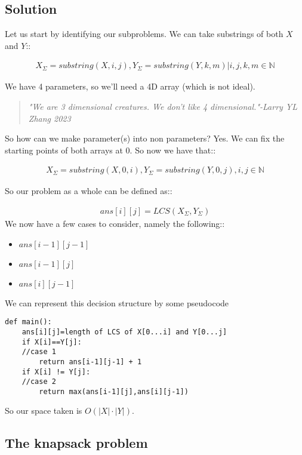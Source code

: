 \documentclass[12pt]{book}
\begin{document}
\subsection*{Solution}
Let us start by identifying our subproblems. We can take substrings of both $X$ and $Y$::

\begin{align*}
    X_{\Sigma}=substring(X,i,j), Y_{\Sigma}=substring(Y,k,m)|i,j,k,m\in \mathbb{N}
\end{align*}

We have 4 parameters, so we'll need a 4D array (which is not ideal).

\begin{quote}
    \textit{"We are 3 dimensional creatures. We don't like 4 dimensional."-Larry YL Zhang 2023}
\end{quote}

So how can we make parameter(s) into non parameters? Yes. We can fix the starting points of both arrays at 0. So now we have that::

\begin{align*}
    X_{\Sigma}=substring(X,0,i), Y_{\Sigma}=substring(Y,0,j), i,j\in \mathbb{N}
\end{align*}

So our problem as a whole can be defined as::

\begin{align*}
    ans[i][j]=LCS(X_{\Sigma}, Y_{\Sigma})
\end{align*}
\newpage
We now have a few cases to consider, namely the following::

\begin{itemize}
    \item $ans[i-1][j-1]$
    \item $ans[i-1][j]$
    \item $ans[i][j-1]$
\end{itemize}

We can represent this decision structure by some pseudocode

\begin{lstlisting}
def main():
    ans[i][j]=length of LCS of X[0...i] and Y[0...j]
    if X[i]==Y[j]:
    //case 1
        return ans[i-1][j-1] + 1
    if X[i] != Y[j]:
    //case 2
        return max(ans[i-1][j],ans[i][j-1])
\end{lstlisting}

So our space taken is $O(|X|\cdot|Y|)$.

\subsection*{The knapsack problem}
\end{document}
